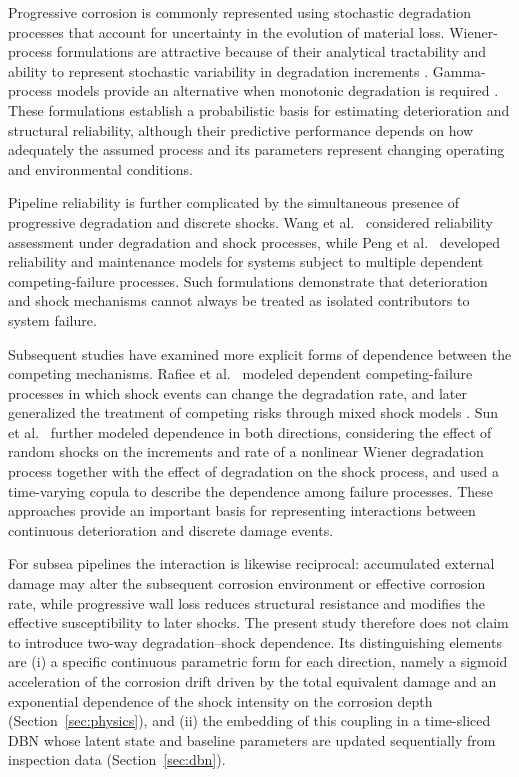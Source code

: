 \documentclass[journal]{IEEEtran}
\begin{document}
Progressive corrosion is commonly represented using stochastic
degradation processes that account for uncertainty in the evolution of
material loss. Wiener-process formulations are attractive because of
their analytical tractability and ability to represent stochastic
variability in degradation increments \cite{zhang2018}. Gamma-process
models provide an alternative when monotonic degradation is required
\cite{ling2015}. These formulations establish a probabilistic basis for
estimating deterioration and structural reliability, although their
predictive performance depends on how adequately the assumed process
and its parameters represent changing operating and environmental
conditions.

Pipeline reliability is further complicated by the simultaneous
presence of progressive degradation and discrete shocks. Wang
et al.~\cite{wang2011} considered reliability assessment under
degradation and shock processes, while Peng et al.~\cite{peng2010}
developed reliability and maintenance models for systems subject to
multiple dependent competing-failure processes. Such formulations
demonstrate that deterioration and shock mechanisms cannot always be
treated as isolated contributors to system failure.

Subsequent studies have examined more explicit forms of dependence
between the competing mechanisms. Rafiee et al.~\cite{rafiee2014}
modeled dependent competing-failure processes in which shock events can
change the degradation rate, and later generalized the treatment of
competing risks through mixed shock models \cite{rafiee2017}.
Sun et al.~\cite{sun2021} further modeled dependence in both
directions, considering the effect of random shocks on the increments
and rate of a nonlinear Wiener degradation process together with the
effect of degradation on the shock process, and used a time-varying
copula to describe the dependence among failure processes. These approaches provide
an important basis for representing interactions between continuous
deterioration and discrete damage events.

For subsea pipelines the interaction is likewise reciprocal:
accumulated external damage may alter the subsequent corrosion
environment or effective corrosion rate, while progressive wall loss
reduces structural resistance and modifies the effective
susceptibility to later shocks. The present study therefore does not
claim to introduce two-way degradation--shock dependence. Its
distinguishing elements are (i) a specific continuous parametric form
for each direction, namely a sigmoid acceleration of the corrosion
drift driven by the total equivalent damage and an exponential
dependence of the shock intensity on the corrosion depth
(Section~\ref{sec:physics}), and (ii) the embedding of this coupling in
a time-sliced DBN whose latent state and baseline parameters are
updated sequentially from inspection data (Section~\ref{sec:dbn}).
\end{document}
